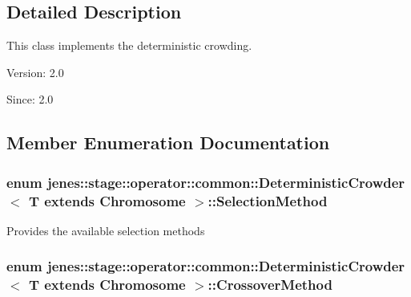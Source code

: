\subsection{Detailed Description}
This class implements the deterministic crowding.

\begin{Desc}
\item[Version:]2.0 \end{Desc}
\begin{Desc}
\item[Since:]2.0 \end{Desc}


\subsection{Member Enumeration Documentation}
\hypertarget{classjenes_1_1stage_1_1operator_1_1common_1_1_deterministic_crowder_3_01_t_01extends_01_chromosome_01_4_f734ac23216aafb25e63014b0b676e67}{
\subsubsection[SelectionMethod]{\setlength{\rightskip}{0pt plus 5cm}enum jenes::stage::operator::common::DeterministicCrowder$<$ T extends Chromosome $>$::{\bf SelectionMethod}}}
\label{classjenes_1_1stage_1_1operator_1_1common_1_1_deterministic_crowder_3_01_t_01extends_01_chromosome_01_4_f734ac23216aafb25e63014b0b676e67}


Provides the available selection methods \hypertarget{classjenes_1_1stage_1_1operator_1_1common_1_1_deterministic_crowder_3_01_t_01extends_01_chromosome_01_4_e58e16af4a8087c42225aa099718231d}{
\subsubsection[CrossoverMethod]{\setlength{\rightskip}{0pt plus 5cm}enum jenes::stage::operator::common::DeterministicCrowder$<$ T extends Chromosome $>$::{\bf CrossoverMethod}}}
\label{classjenes_1_1stage_1_1operator_1_1common_1_1_deterministic_crowder_3_01_t_01extends_01_chromosome_01_4_e58e16af4a8087c42225aa099718231d}


